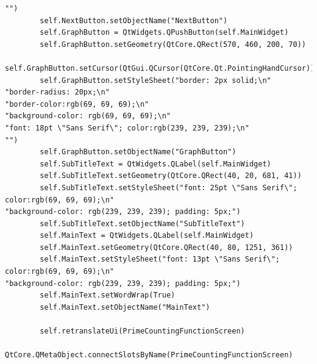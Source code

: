 \documentclass[12pt]{article}
\begin{document}
\begin{lstlisting}
"")
        self.NextButton.setObjectName("NextButton")
        self.GraphButton = QtWidgets.QPushButton(self.MainWidget)
        self.GraphButton.setGeometry(QtCore.QRect(570, 460, 200, 70))
        self.GraphButton.setCursor(QtGui.QCursor(QtCore.Qt.PointingHandCursor))
        self.GraphButton.setStyleSheet("border: 2px solid;\n"
"border-radius: 20px;\n"
"border-color:rgb(69, 69, 69);\n"
"background-color: rgb(69, 69, 69);\n"
"font: 18pt \"Sans Serif\"; color:rgb(239, 239, 239);\n"
"")
        self.GraphButton.setObjectName("GraphButton")
        self.SubTitleText = QtWidgets.QLabel(self.MainWidget)
        self.SubTitleText.setGeometry(QtCore.QRect(40, 20, 681, 41))
        self.SubTitleText.setStyleSheet("font: 25pt \"Sans Serif\"; color:rgb(69, 69, 69);\n"
"background-color: rgb(239, 239, 239); padding: 5px;")
        self.SubTitleText.setObjectName("SubTitleText")
        self.MainText = QtWidgets.QLabel(self.MainWidget)
        self.MainText.setGeometry(QtCore.QRect(40, 80, 1251, 361))
        self.MainText.setStyleSheet("font: 13pt \"Sans Serif\"; color:rgb(69, 69, 69);\n"
"background-color: rgb(239, 239, 239); padding: 5px;")
        self.MainText.setWordWrap(True)
        self.MainText.setObjectName("MainText")

        self.retranslateUi(PrimeCountingFunctionScreen)
        QtCore.QMetaObject.connectSlotsByName(PrimeCountingFunctionScreen)


\end{lstlisting}
\end{document}
